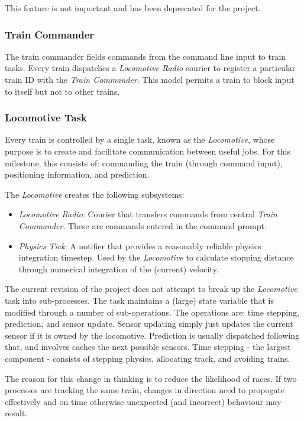 \documentclass[twoside,a4paper]{refart}
\begin{document}
This feature is not important and has been deprecated for the project.

\subsubsection{Train Commander}
\label{sec:traincommander}
The train commander fields commands from the command line input to train tasks. Every train dispatches a \textit{Locomotive Radio} courier to register a particular train ID with the \textit{Train Commander}. This model permits a train to block input to itself but not to other trains.

\subsubsection{Locomotive Task}
Every train is controlled by a single task, known as the \textit{Locomotive}, whose purpose is to create and facilitate communication between useful jobs. For this milestone, this consists of: commanding the train (through command input), positioning information, and prediction.

The \textit{Locomotive} creates the following subsystems:
\begin{itemize}
    \item{ \textit{Locomotive Radio}: Courier that transfers commands from central \textit{Train Commander}. These are commands entered in the command prompt.}
    \item{ \textit{Physics Tick}: A notifier that provides a reasonably reliable physics integration timestep. Used by the \textit{Locomotive} to calculate stopping distance through numerical integration of the (current) velocity. }
\end{itemize}

The current revision of the project does not attempt to break up the \textit{Locomotive} task into sub-processes. The task maintains a (large) state variable that is modified through a number of sub-operations. The operations are: time stepping, prediction, and sensor update. Sensor updating simply just updates the current sensor if it is owned by the locomotive. Prediction is usually dispatched following that, and involves caches the next possible sensors. Time stepping - the largest component - consists of stepping physics, allocating track, and avoiding trains.

The reason for this change in thinking is to reduce the likelihood of races. If two processes are tracking the same train, changes in direction need to propogate effectively and on time otherwise unexpected (and incorrect) behaviour may result.
\end{document}
